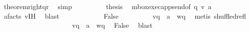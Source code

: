 \begin{isabellebody}
\ theorem{\isacharunderscore}{\kern0pt}right{\isacharunderscore}{\kern0pt}qr\ \isamarkupfalse%
\ simp\isanewline
\ \ \ \ \ \ \isamarkupfalse%
\ \isamarkupfalse%
\ {\isacharquery}{\kern0pt}thesis\ \isamarkupfalse%
\ mbox{\isacharunderscore}{\kern0pt}exec{\isacharunderscore}{\kern0pt}app{\isacharunderscore}{\kern0pt}send{\isacharbrackleft}{\kern0pt}of\ q\ {\isachardoublequoteopen}{\isacharquery}{\kern0pt}v{\isacharprime}{\kern0pt}{\isachardoublequoteclose}\ a{\isacharbrackright}{\kern0pt}\ \isamarkupfalse%
\ a{\isacharunderscore}{\kern0pt}facts\ v{\isacharunderscore}{\kern0pt}IH\ \isamarkupfalse%
\ blast\isanewline
\ \ \ \ \isamarkupfalse%
\isanewline
\ \ \ \ \ \ \isamarkupfalse%
\ False\isanewline
\ \ \ \ \ \ \isamarkupfalse%
\ \isamarkupfalse%
\ {\isachardoublequoteopen}{\isacharparenleft}{\kern0pt}{\isacharquery}{\kern0pt}v{\isacharprime}{\kern0pt}{\isasymdown}\isactrlsub q\ {\isasymsqdot}\ {\isacharbrackleft}{\kern0pt}a{\isacharbrackright}{\kern0pt}{\isacharparenright}{\kern0pt}\ {\isasymnoteq}\ {\isacharparenleft}{\kern0pt}{\isacharquery}{\kern0pt}wq{\isacharparenright}{\kern0pt}{\isachardoublequoteclose}\ \isamarkupfalse%
\ {\isacharparenleft}{\kern0pt}metis\ shuffled{\isachardot}{\kern0pt}refl{\isacharparenright}{\kern0pt}\isanewline
\ \ \ \ \ \ \ \ \ \ \isanewline
\ \ \ \ \ \ \isamarkupfalse%
\ \isamarkupfalse%
\ {\isachardoublequoteopen}{\isasymnot}\ {\isacharparenleft}{\kern0pt}{\isacharparenleft}{\kern0pt}{\isacharquery}{\kern0pt}v{\isacharprime}{\kern0pt}{\isasymdown}\isactrlsub q\ {\isasymsqdot}\ {\isacharbrackleft}{\kern0pt}a{\isacharbrackright}{\kern0pt}{\isacharparenright}{\kern0pt}\ {\isasymsqunion}{\isasymsqunion}\isactrlsub {\isacharquery}{\kern0pt}\ {\isacharparenleft}{\kern0pt}{\isacharquery}{\kern0pt}wq{\isacharparenright}{\kern0pt}{\isacharparenright}{\kern0pt}{\isachardoublequoteclose}\ \isamarkupfalse%
\ False\ \isamarkupfalse%
\ blast\isanewline
\ \ \ \ \ \ \isamarkupfalse%
\ \isamarkupfalse%

\end{isabellebody}
